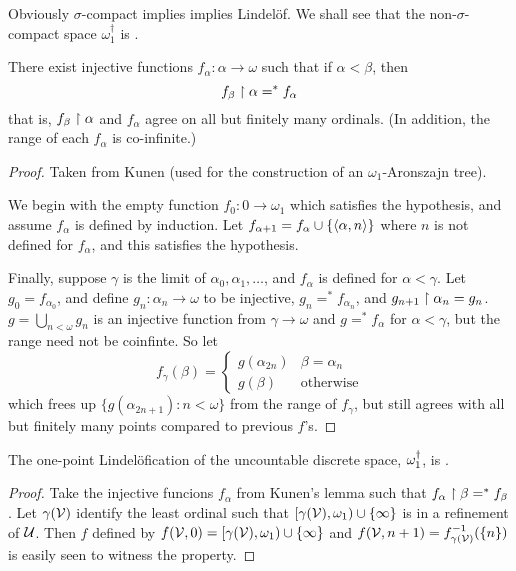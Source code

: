  Obviously $\sigma$-compact implies \scish implies Lindel\"of. We shall see that the non-$\sigma$-compact space $\omega_1^\dagger$ is \scish.

   \begin{lemma}
    There exist injective functions $f_\alpha:\alpha\to\omega$ such that if $\alpha<\beta$, then \[f_\beta\restriction\alpha =^* f_\alpha\] that is, $f_\beta\restriction\alpha$ and $f_\alpha$ agree on all but finitely many ordinals. (In addition, the range of each $f_\alpha$ is co-infinite.)
  \end{lemma}

  \begin{proof}
    Taken from Kunen (used for the construction of an $\omega_1$-Aronszajn tree).

    We begin with the empty function $f_0:0\to\omega_1$ which satisfies the hypothesis, and assume $f_\alpha$ is defined by induction. Let $f_{\alpha+1} = f_\alpha \cup \{\langle\alpha,n\rangle\}$ where $n$ is not defined for $f_\alpha$, and this satisfies the hypothesis.

    Finally, suppose $\gamma$ is the limit of $\alpha_0,\alpha_1,\dots$, and $f_\alpha$ is defined for $\alpha<\gamma$. Let $g_0=f_{\alpha_0}$, and define $g_n : \alpha_n \to \omega$ to be injective, $g_n=^* f_{\alpha_n}$, and $g_{n+1} \restriction \alpha_n = g_n$. $g = \bigcup_{n<\omega} g_n$ is an injective function from $\gamma \to \omega$ and $g =^* f_\alpha$ for $\alpha <\gamma$, but the range need not be coinfinte. So let
    \[
      f_\gamma(\beta) = \left\{
      \begin{array}{ll}
        g(\alpha_{2n}) & \beta = \alpha_n \\
        g(\beta) & \text{otherwise}
      \end{array}
      \right.
    \]
    which frees up $\{g(\alpha_{2n+1}):n<\omega\}$ from the range of $f_\gamma$, but still agrees with all but finitely many points compared to previous $f$'s.
  \end{proof}

  \begin{theorem}
    The one-point Lindel\"ofication of the uncountable discrete space, $\omega_1^\dagger$, is \scish.
  \end{theorem}

  \begin{proof}
    Take the injective funcions $f_\alpha$ from Kunen's lemma such that $f_\alpha\restriction\beta =^* f_\beta$. Let $\gamma(\mathcal{V})$ identify the least ordinal such that $[\gamma(\mathcal{V}),\omega_1)\cup\{\infty\}$ is in a refinement of $\mathcal{U}$. Then $f$ defined by $f(\mathcal{V},0)=[\gamma(\mathcal{V}),\omega_1)\cup\{\infty\}$ and $f(\mathcal{V},n+1) = f_{\gamma(\mathcal{V})}^{-1}(\{n\})$ is easily seen to witness the property.
  \end{proof}

